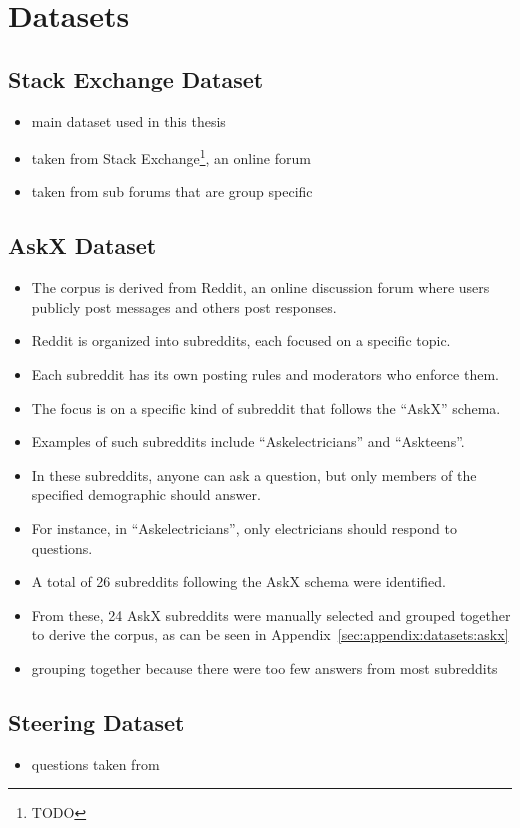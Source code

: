 \chapter{Datasets}%
\label{sec:datasets}

\section{Stack Exchange Dataset}%
\label{sec:datasets:stackex}

\begin{itemize}
  \item main dataset used in this thesis
  \item taken from Stack Exchange\footnote{TODO}, an online forum
  \item taken from sub forums that are group specific
\end{itemize}

\section{AskX Dataset}%
\label{sec:datasets:askx}
\begin{itemize}
  \item The corpus is derived from Reddit, an online discussion forum where users publicly post messages and others post responses.
  \item Reddit is organized into subreddits, each focused on a specific topic.
  \item Each subreddit has its own posting rules and moderators who enforce them.
  \item The focus is on a specific kind of subreddit that follows the \enquote{AskX} schema.
  \item Examples of such subreddits include \enquote{Askelectricians} and \enquote{Askteens}.
  \item In these subreddits, anyone can ask a question, but only members of the specified demographic should answer.
  \item For instance, in \enquote{Askelectricians}, only electricians should respond to questions.
  \item A total of 26 subreddits following the AskX schema were identified.
  \item From these, 24 AskX subreddits were manually selected and grouped together to derive the corpus, as can be seen in Appendix~\ref{sec:appendix:datasets:askx}
  \item grouping together because there were too few answers from most subreddits
\end{itemize}



\section{Steering Dataset}%
\label{sec:datasets:steering}
\begin{itemize}
  \item questions taken from \citet{petroni-etal-2021-kilt,rooeinKnowYourAudience2023}
\end{itemize}
